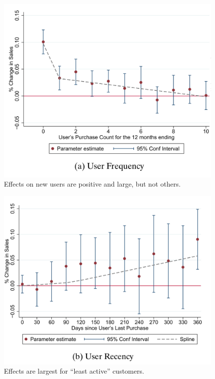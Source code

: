 \documentclass{beamer}
\begin{document}
\begin{frame}

  \begin{figure}
    \begin{center}
      \includegraphics[scale=0.2]{./lecture_includes/tadelis_newuser_fig1.png}
      \caption{Effects on new users are positive and large, but not others. }
    \end{center}
  \end{figure}

\end{frame}

\begin{frame}

  \begin{figure}
    \begin{center}
      \includegraphics[scale=0.2]{./lecture_includes/tadelis_newuser_fig2.png}
      \caption{Effects are largest for ``least active'' customers. }
    \end{center}
  \end{figure}

\end{frame}
\end{document}
